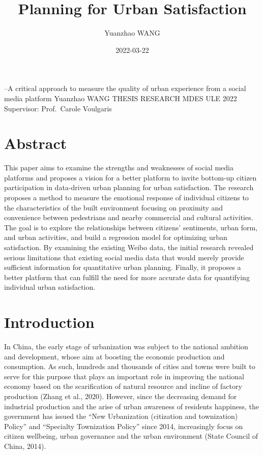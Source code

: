 \documentclass[
]{article}
\title{Planning for Urban Satisfaction}
\author{Yuanzhao WANG}
\date{2022-03-22}
\begin{document}
\maketitle

--A critical approach to measure the quality of urban experience from a
social media platform Yuanzhao WANG THESIS RESEARCH MDES ULE 2022
Supervisor: Prof.~Carole Voulgaris

\hypertarget{abstract}{%
\section{Abstract}\label{abstract}}

This paper aims to examine the strengths and weaknesses of social media
platforms and proposes a vision for a better platform to invite
bottom-up citizen participation in data-driven urban planning for urban
satisfaction. The research proposes a method to measure the emotional
response of individual citizens to the characteristics of the built
environment focusing on proximity and convenience between pedestrians
and nearby commercial and cultural activities. The goal is to explore
the relationships between citizens' sentiments, urban form, and urban
activities, and build a regression model for optimizing urban
satisfaction. By examining the existing Weibo data, the initial research
revealed serious limitations that existing social media data that would
merely provide sufficient information for quantitative urban planning.
Finally, it proposes a better platform that can fulfill the need for
more accurate data for quantifying individual urban satisfaction.

\hypertarget{introduction}{%
\section{Introduction}\label{introduction}}

In China, the early stage of urbanization was subject to the national
ambition and development, whose aim at boosting the economic production
and consumption. As such, hundreds and thousands of cities and towns
were built to serve for this purpose that plays an important role in
improving the national economy based on the scarification of natural
resource and incline of factory production (Zhang et al., 2020).
However, since the decreasing demand for industrial production and the
arise of urban awareness of residents happiness, the government has
issued the ``New Urbanization (citization and townization) Policy'' and
``Specialty Townization Policy'' since 2014, increasingly focus on
citizen wellbeing, urban governance and the urban environment (State
Council of China, 2014).
\end{document}
